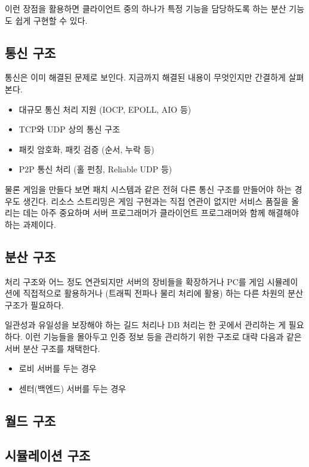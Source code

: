 \documentclass[chapter,kosection, 10.5pt, romanfixed, a4paper]{oblivoir}
\begin{document}
이런 장점을 활용하면 클라이언트 중의 하나가 특정 기능을 담당하도록 하는 
분산 기능도 쉽게 구현할 수 있다. 


\subsection{통신 구조}

통신은 이미 해결된 문제로 보인다. 지금까지 해결된 내용이 무엇인지만 
간결하게 살펴본다. 

\begin{itemize}
\item 대규모 통신 처리 지원 (IOCP, EPOLL, AIO 등)
\item TCP와 UDP 상의 통신 구조 
\item 패킷 암호화, 패킷 검증 (순서, 누락 등)
\item P2P 통신 처리 (홀 펀칭, Reliable UDP 등)
\end{itemize}

물론 게임을 만들다 보면 패치 시스템과 같은 전혀 다른 통신 구조를 
만들어야 하는 경우도 생긴다. 리소스 스트리밍은 게임 구현과는 
직접 연관이 없지만 서비스 품질을 올리는 데는 아주 중요하며 
서버 프로그래머가 클라이언트 프로그래머와 함께 해결해야 하는 과제이다. 

\subsection{분산 구조}

처리 구조와 어느 정도 연관되지만 서버의 장비들을 확장하거나 PC를 게임 
시뮬레이션에 직접적으로 활용하거나 (트래픽 전파나 물리 처리에 활용) 하는 
다른 차원의 분산 구조가 필요하다. 

일관성과 유일성을 보장해야 하는 길드 처리나 DB 처리는 한 곳에서 관리하는 게 
필요하다. 이런 기능들을 몰아두고 인증 정보 등을 관리하기 위한 구조로 대략
다음과 같은 서버 분산 구조를 채택한다. 

\begin{itemize}
\item 로비 서버를 두는 경우
\item 센터(백엔드) 서버를 두는 경우 
\end{itemize}



\subsection{월드 구조}



\subsection{시뮬레이션 구조}
\end{document}
